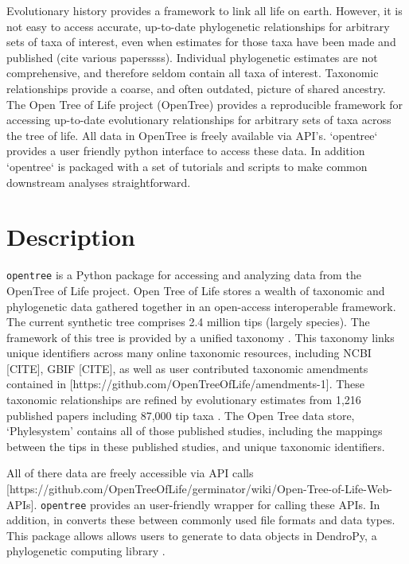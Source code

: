 \documentclass[oupdraft]{sysbio_sse}
\begin{document}
Evolutionary history provides a framework to link all life on earth. However, it is not easy to access accurate, up-to-date phylogenetic relationships for arbitrary sets of taxa of interest, even when estimates for those taxa have been made and published (cite various paperssss). Individual phylogenetic estimates are not comprehensive, and therefore seldom contain all taxa of interest. Taxonomic relationships provide a coarse, and often outdated, picture of shared ancestry. 
The Open Tree of Life project (OpenTree) provides a reproducible framework for accessing up-to-date evolutionary relationships for arbitrary sets of taxa across the tree of life.
All data in OpenTree is freely available via API's.
`opentree` provides a user friendly python interface to access these data. In addition `opentree` is packaged with a set of tutorials and scripts to make common downstream analyses straightforward.

\bigskip
\section{Description}
\label{sec2}

\texttt{opentree} is a Python package for accessing and analyzing data from the OpenTree of Life project.
Open Tree of Life stores a wealth of taxonomic and phylogenetic data gathered together in an open-access interoperable framework.
The current synthetic tree \citep{opentreeoflife_open_2019} comprises 2.4 million tips (largely species).
The framework of this tree is provided by a unified taxonomy \citep{opentreeoflife_open_2019-1, rees_automated_2017}.
This taxonomy links unique identifiers across many online taxonomic resources, including NCBI [CITE], GBIF [CITE], as well as user contributed taxonomic amendments contained in [https://github.com/OpenTreeOfLife/amendments-1].
These taxonomic relationships are refined by evolutionary estimates from 1,216 published papers including 87,000 tip taxa \citep{opentreeoflife_open_2019, redelings_supertree_2017}.
The Open Tree data store, `Phylesystem' \citep{mctavish_phylesystem:_2015} contains all of those published studies, including the mappings between the tips in these published studies, and unique taxonomic identifiers.

All of there data are freely accessible via API calls [https://github.com/OpenTreeOfLife/germinator/wiki/Open-Tree-of-Life-Web-APIs].
\texttt{opentree}  provides an user-friendly wrapper for calling these APIs.
In addition, in converts these between commonly used file formats and data types.
This package allows allows users to generate to data objects in DendroPy, a phylogenetic computing library \citep{sukumaran_dendropy_2010}.
\end{document}
